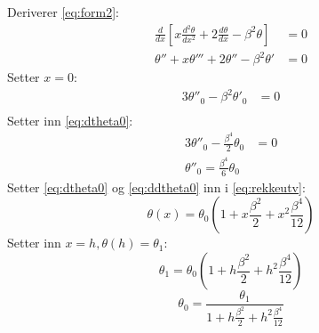 Deriverer \eqref{eq:form2}:
\begin{align}
  \frac{d}{dx} \left[ x \frac{d^2 \theta}{dx^2} + 2 \frac{d\theta}{dx} - \beta^2 \theta \right] &= 0 \nonumber \\
  \theta'' + x \theta''' + 2 \theta'' - \beta^2 \theta' &= 0 \nonumber
\end{align}
Setter $x=0$:
\begin{align}
  3\theta''_0 - \beta^2 \theta'_0 &= 0 \nonumber \\
\end{align}
Setter inn \eqref{eq:dtheta0}:
\begin{align}
  3\theta''_0 - \frac{\beta^4}{2}\theta_0  &= 0 \nonumber \\
  \theta''_0 = \frac{\beta^4}{6} \theta_0 \label{eq:ddtheta0}
\end{align}
Setter \eqref{eq:dtheta0} og \eqref{eq:ddtheta0} inn i \eqref{eq:rekkeutv}:
\begin{equation}
  \theta(x) = \theta_0 \left( 1 + x \frac{\beta^2}{2} + x^2 \frac{\beta^4}{12} \right)
\end{equation}
Setter inn $x=h,\theta(h)=\theta_1$:
\begin{equation}
  \theta_1 = \theta_0 \left( 1 + h \frac{\beta^2}{2} + h^2 \frac{\beta^4}{12} \right)
\end{equation}
\begin{equation}
  \theta_0 = \frac{\theta_1}{1 + h \frac{\beta^2}{2} + h^2 \frac{\beta^4}{12}} \label{eq:theta0}
\end{equation}



